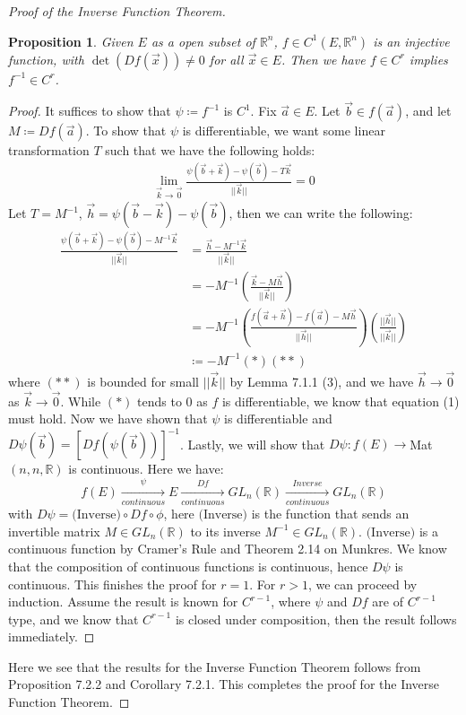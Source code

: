 \documentclass[15pt]{book}
\theoremstyle{break}
\theoremstyle{break}
\newtheorem{prop}[lem]{Proposition}
\newcommand{\R}{\mathbb{R}}
\begin{document}
\begin{proof}[Proof of the Inverse Function Theorem]
\begin{prop}
\setlength{\leftskip}{1cm} Given $E$ as a open subset of $\R^n$, $f \in C^1(E,\R^n)$ is an injective function, with $\det(Df(\vec{x})) \neq 0$ for all $\vec{x}\in E$. Then we have $f \in C^r$ implies $f^{-1} \in C^r$. 
\end{prop}
\begin{proof}
\setlength{\leftskip}{1cm}It suffices to show that $\psi \coloneqq f^{-1}$ is $C^1$. Fix $\vec{a}\in E$. Let $\vec{b} \in f(\vec{a})$, and let $M\coloneqq Df(\vec{a})$. To show that $\psi$ is differentiable, we want some linear transformation $T$ such that we have the following holds:
\begin{align*}\lim_{\vec{k}\to \vec{0}}\frac{\psi(\vec{b}+\vec{k})-\psi(\vec{b}) - T\vec{k}}{||\vec{k}||} = 0 \tag{1}
\end{align*}
Let $T = M^{-1}$, $\vec{h}= \psi(\vec{b}-\vec{k})-\psi(\vec{b})$, then we can write the following:
\begin{align*}
\frac{\psi(\vec{b}+\vec{k})-\psi(\vec{b}) - M^{-1}\vec{k}}{||\vec{k}||} &= \frac{\vec{h}-M^{-1}\vec{k}}{||\vec{k}||}\\ &= -M^{-1}\left(\frac{\vec{k}-M\vec{h}}{||\vec{k}||}  \right)\\
&= -M^{-1} \left(\frac{f(\vec{a}+\vec{h}) - f(\vec{a}) - M\vec{h}}{||\vec{h}||}  \right)\left(\frac{||\vec{h}||}{||\vec{k}||} \right) \\
&\coloneqq -M^{-1} (*)(**)
\end{align*}
where $(**)$ is bounded for small $||\vec{k}||$ by Lemma 7.1.1 (3), and we have $\vec{h}\to \vec{0}$ as $\vec{k}\to \vec{0}$. While $(*)$ tends to $0$ as $f$ is differentiable, we know that equation (1) must hold. Now we have shown that $\psi$ is differentiable and $D\psi(\vec{b}) = [Df(\psi(\vec{b}))]^{-1}$. Lastly, we will show that $D\psi: f(E) \to $Mat$(n,n,\R)$ is continuous. Here we have:
$$f(E)\xrightarrow[continuous]{\psi}E\xrightarrow[continuous]{Df}GL_{n}(\R) \xrightarrow[continuous]{Inverse}GL_{n}(\R)$$
with $D\psi = \text{(Inverse)} \circ Df \circ \phi$, here $\text{(Inverse)}$ is the function that sends an invertible matrix $M\in GL_{n}(\R)$ to its inverse $M^{-1}\in GL_{n}(\R)$. $\text{(Inverse)}$ is a continuous function by Cramer's Rule and Theorem 2.14 on Munkres. We know that the composition of continuous functions is continuous, hence $D\psi$ is continuous. This finishes the proof for $r=1$. For $r>1$, we can proceed by induction. Assume the result is known for $C^{r-1}$, where $\psi$ and $Df$ are of $C^{r-1}$ type, and we know that $C^{r-1}$ is closed under composition, then the result follows immediately. 
\end{proof}

Here we see that the results for the Inverse Function Theorem follows from Proposition 7.2.2 and Corollary 7.2.1. This completes the proof for the Inverse Function Theorem. \end{proof}
\end{document}
